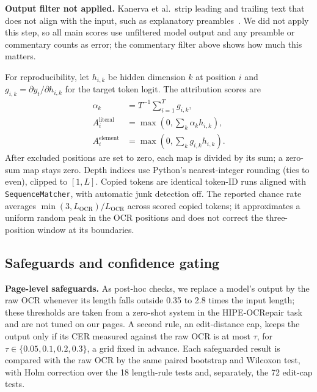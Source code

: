 \documentclass[conference]{IEEEtran}
\begin{document}
\textbf{Output filter not applied.} Kanerva et al.\ strip leading and trailing text that does not align with the input, such as explanatory preambles~\cite{kanerva2025nofreelunches}. We did not apply this step, so all main scores use unfiltered model output and any preamble or commentary counts as error; the commentary filter above shows how much this matters.

For reproducibility, let $h_{i,k}$ be hidden dimension $k$ at position $i$ and $g_{i,k}=\partial y_t/\partial h_{i,k}$ for the target token logit. The attribution scores are
\begin{align}
\alpha_k &= T^{-1}\sum_{i=1}^{T}g_{i,k},\\
A_i^{\mathrm{literal}} &= \max(0,\sum_k\alpha_k h_{i,k}),\\
A_i^{\mathrm{element}} &= \max(0,\sum_k g_{i,k}h_{i,k}).
\end{align}
After excluded positions are set to zero, each map is divided by its sum; a zero-sum map stays zero. Depth indices use Python's nearest-integer rounding (ties to even), clipped to $[1,L]$. Copied tokens are identical token-ID runs aligned with \texttt{SequenceMatcher}, with automatic junk detection off. The reported chance rate averages $\min(3,L_{\mathrm{OCR}})/L_{\mathrm{OCR}}$ across scored copied tokens; it approximates a uniform random peak in the OCR positions and does not correct the three-position window at its boundaries.

\subsection{Safeguards and confidence gating}
\label{sec:gatemethod}
\textbf{Page-level safeguards.} As post-hoc checks, we replace a model's output by the raw OCR whenever its length falls outside 0.35 to 2.8 times the input length; these thresholds are taken from a zero-shot system in the HIPE-OCRepair task~\cite{ehrmann2026hipeocrepair} and are not tuned on our pages. A second rule, an edit-distance cap, keeps the output only if its CER measured against the raw OCR is at most $\tau$, for $\tau \in \{0.05, 0.1, 0.2, 0.3\}$, a grid fixed in advance. Each safeguarded result is compared with the raw OCR by the same paired bootstrap and Wilcoxon test, with Holm correction over the 18 length-rule tests and, separately, the 72 edit-cap tests.
\end{document}
